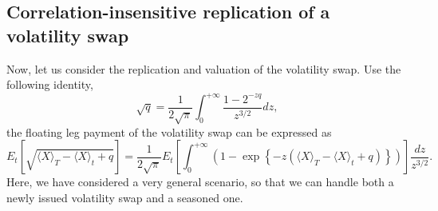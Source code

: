 \documentclass[12pt]{article}
\begin{document}
    \subsection{Correlation-insensitive replication of a volatility swap}
      Now, let us consider the replication and valuation of the volatility swap. Use the following identity,
      \begin{equation}
        \sqrt{q} = \frac{1}{2\sqrt{\pi}}\int_0^{+\infty}\frac{1-2^{-zq}}{z^{3/2}}dz,
      \end{equation}
      the floating leg payment of the volatility swap can be expressed as
      \begin{equation}
        E_t\left[\sqrt{\langle X \rangle_T - \langle X \rangle_t+q}\right]
          =\frac{1}{2\sqrt{\pi}}E_t\left[\int_0^{+\infty}
          \left(1-\exp\left\{-z\left(\langle X \rangle_T - \langle X \rangle_t+q\right)\right\}\right)\right]
          \frac{dz}{z^{3/2}}.
      \end{equation}
      Here, we have considered a very general scenario, so that we can handle both a newly issued volatility
      swap and a seasoned one.
\end{document}
